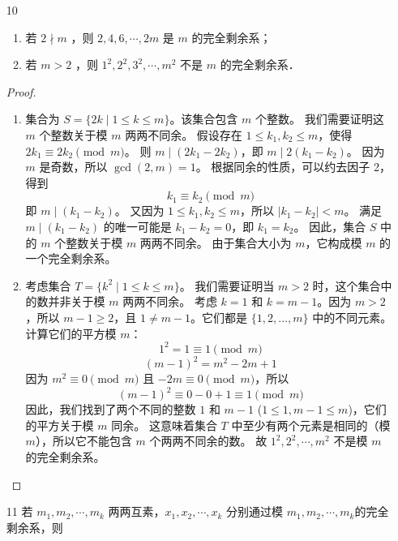 \begin{enumerate}
\begin{proof}
        这说明该集合中的 $p^s$ 个数两两关于模 $p^s$ 不同余。
        综上所述，该集合构成模 $p^s$ 的一个完全剩余系。
    \end{proof}
    \item[10] \begin{enumerate}
        \item 若 $2 \nmid m$ ，则 $2,4,6, \cdots, 2 m$ 是 $m$ 的完全剩余系；
        \item 若 $m>2$ ，则 $1^2, 2^2, 3^2, \cdots, m^2$ 不是 $m$ 的完全剩余系．
    \end{enumerate}
    \begin{proof}
        \begin{enumerate}
            \item 集合为 $S = \{2k \mid 1 \le k \le m\}$。该集合包含 $m$ 个整数。
            我们需要证明这 $m$ 个整数关于模 $m$ 两两不同余。
            假设存在 $1 \le k_1, k_2 \le m$，使得 $2k_1 \equiv 2k_2 \pmod m$。
            则 $m \mid (2k_1 - 2k_2)$，即 $m \mid 2(k_1 - k_2)$。
            因为 $m$ 是奇数，所以 $\gcd(2, m) = 1$。
            根据同余的性质，可以约去因子 2，得到
            \[ k_1 \equiv k_2 \pmod m \]
            即 $m \mid (k_1 - k_2)$。
            又因为 $1 \le k_1, k_2 \le m$，所以 $|k_1 - k_2| < m$。
            满足 $m \mid (k_1 - k_2)$ 的唯一可能是 $k_1 - k_2 = 0$，即 $k_1 = k_2$。
            因此，集合 $S$ 中的 $m$ 个整数关于模 $m$ 两两不同余。
            由于集合大小为 $m$，它构成模 $m$ 的一个完全剩余系。
            \item 考虑集合 $T = \{k^2 \mid 1 \le k \le m\}$。
            我们需要证明当 $m>2$ 时，这个集合中的数并非关于模 $m$ 两两不同余。
            考虑 $k=1$ 和 $k=m-1$。因为 $m>2$，所以 $m-1 \ge 2$，且 $1 \ne m-1$。它们都是 $\{1, 2, \dots, m\}$ 中的不同元素。
            计算它们的平方模 $m$：
            \[ 1^2 = 1 \equiv 1 \pmod m \]
            \[ (m-1)^2 = m^2 - 2m + 1 \]
            因为 $m^2 \equiv 0 \pmod m$ 且 $-2m \equiv 0 \pmod m$，所以
            \[ (m-1)^2 \equiv 0 - 0 + 1 \equiv 1 \pmod m \]
            因此，我们找到了两个不同的整数 $1$ 和 $m-1$ ($1 \le 1, m-1 \le m$)，它们的平方关于模 $m$ 同余。
            这意味着集合 $T$ 中至少有两个元素是相同的（模 $m$），所以它不能包含 $m$ 个两两不同余的数。
            故 $1^2, 2^2, \cdots, m^2$ 不是模 $m$ 的完全剩余系。
        \end{enumerate}
    \end{proof}
    \item[11] 若 $m_1, m_2, \cdots, m_k$ 两两互素，$x_1, x_2, \cdots, x_k$ 分别通过模 $m_1, m_2, \cdots, m_k$的完全剩余系，则

\end{enumerate}
